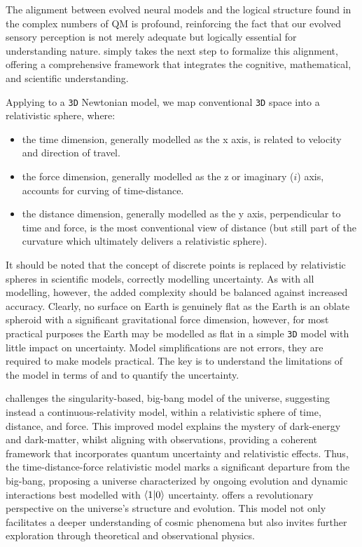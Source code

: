 \documentclass[12pt]{article}
\begin{document}
The alignment between evolved neural models and the logical structure found in the complex numbers of QM is profound, reinforcing the fact that our evolved sensory perception is not merely adequate but logically essential for understanding nature. \iR{} simply takes the next step to formalize this alignment, offering a comprehensive framework that integrates the cognitive, mathematical, and scientific understanding.

Applying \iR{} to a \texttt{3D} Newtonian model, we map conventional \texttt{3D} space into a \iR{} relativistic sphere, where:
\begin{itemize}
    \item the time dimension, generally modelled as the x axis, is related to velocity and direction of travel.
    \item the force dimension, generally modelled as the z or imaginary (\(i\)) axis, accounts for curving of time-distance.
    \item the distance dimension, generally modelled as the y axis, perpendicular to time and force, is the most conventional view of distance (but still part of the \iR{} curvature which ultimately delivers a relativistic sphere).
\end{itemize}

It should be noted that the concept of discrete points is replaced by relativistic spheres in \iR{} scientific models, correctly modelling \qbit{} uncertainty. As with all modelling, however, the added complexity should be balanced against increased accuracy. Clearly, no surface on Earth is genuinely flat as the Earth is an oblate spheroid with a significant gravitational force dimension, however, for most practical purposes the Earth may be modelled as flat in a simple \texttt{3D} model with little impact on uncertainty. Model simplifications are not errors, they are required to make models practical. The key is to understand the limitations of the model in terms of \iR{} and to quantify the uncertainty.

\iR{} challenges the singularity-based, big-bang model of the universe, suggesting instead a continuous-relativity model, within a relativistic \iR{} sphere of time, distance, and force. This improved model explains the mystery of dark-energy and dark-matter, whilst aligning with observations, providing a coherent framework that incorporates quantum uncertainty and relativistic effects. Thus, the \iR{} time-distance-force relativistic model marks a significant departure from the big-bang, proposing a universe characterized by ongoing evolution and dynamic interactions best modelled with \(\langle 1 | 0 \rangle\) uncertainty. \iR{} offers a revolutionary perspective on the universe's structure and evolution. This model not only facilitates a deeper understanding of cosmic phenomena but also invites further exploration through theoretical and observational physics.
\end{document}
